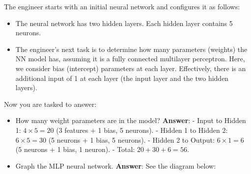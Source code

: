 \documentclass[12pt]{article}
\begin{document}
The engineer starts with an initial neural network and configures it as follows:
\begin{itemize}
    \item The neural network has two hidden layers. Each hidden layer contains 5 neurons.
    \item The engineer's next task is to determine how many parameters (weights) the NN model has, assuming it is a fully connected multilayer perceptron. Here, we consider bias (intercept) parameters at each layer. Effectively, there is an additional input of 1 at each layer (the input layer and the two hidden layers).
\end{itemize}
Now you are tasked to answer:
\begin{itemize}
    \item How many weight parameters are in the model?  
    \textbf{Answer}:  
    - Input to Hidden 1: \( 4 \times 5 = 20 \) (3 features + 1 bias, 5 neurons).  
    - Hidden 1 to Hidden 2: \( 6 \times 5 = 30 \) (5 neurons + 1 bias, 5 neurons).  
    - Hidden 2 to Output: \( 6 \times 1 = 6 \) (5 neurons + 1 bias, 1 neuron).  
    - Total: \( 20 + 30 + 6 = 56 \).
    \item Graph the MLP neural network.  
    \textbf{Answer}: See the diagram below:  
\usetikzlibrary{positioning}

\end{itemize}
\end{document}

